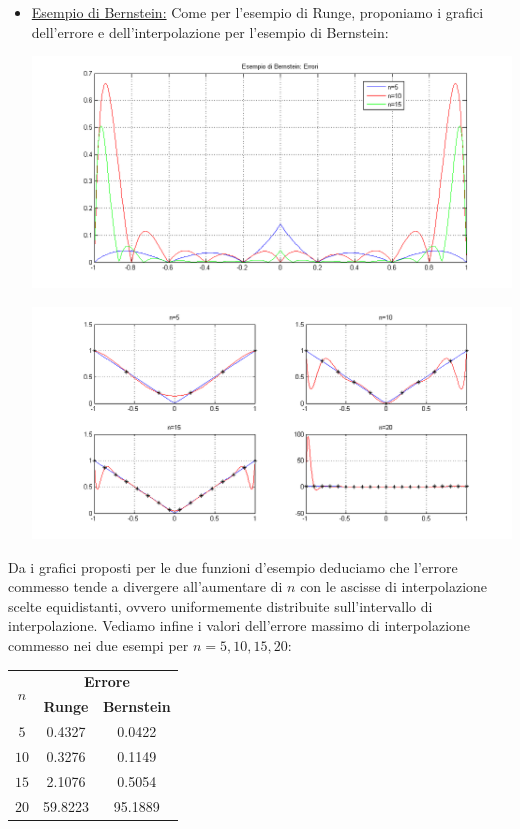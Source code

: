 \begin{sol}
\begin{itemize}
\begin{center}
			\end{center}
		\item \underline{Esempio di Bernstein:}
			Come per l'esempio di Runge, proponiamo i grafici dell'errore e dell'interpolazione per l'esempio di Bernstein:
			\begin{center}
				\includegraphics[scale=0.4]{img/es4_11c.png}
			\end{center}
			\begin{center}
				\includegraphics[scale=0.4]{img/es4_11d.png}
			\end{center}
	\end{itemize}
	Da i grafici proposti per le due funzioni d'esempio deduciamo che l'errore commesso tende a divergere all'aumentare di $n$ con le ascisse di interpolazione scelte equidistanti, ovvero uniformemente distribuite sull'intervallo di interpolazione. Vediamo infine i valori dell'errore massimo di interpolazione commesso nei due esempi per $n=5,10,15,20$:
	\begin{center}
		\begin{tabular}{c||c|c}
			\multirow{2}{*}{$n$} & \multicolumn{2}{|c}{\textbf{Errore}}\\
			& \textbf{Runge} & \textbf{Bernstein}\\
			\hline
			$5$ & 0.4327 & 0.0422\\
			$10$ & 0.3276 & 0.1149\\
			$15$ & 2.1076 & 0.5054\\
			$20$ & 59.8223 & 95.1889
		\end{tabular}
	\end{center}

	

\end{sol}

